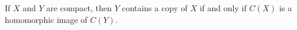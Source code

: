 If $X$ and $Y$ are compact, then $Y$ contains a copy of $X$ if and only if $C(X)$ is a homomorphic image of $C(Y)$.
